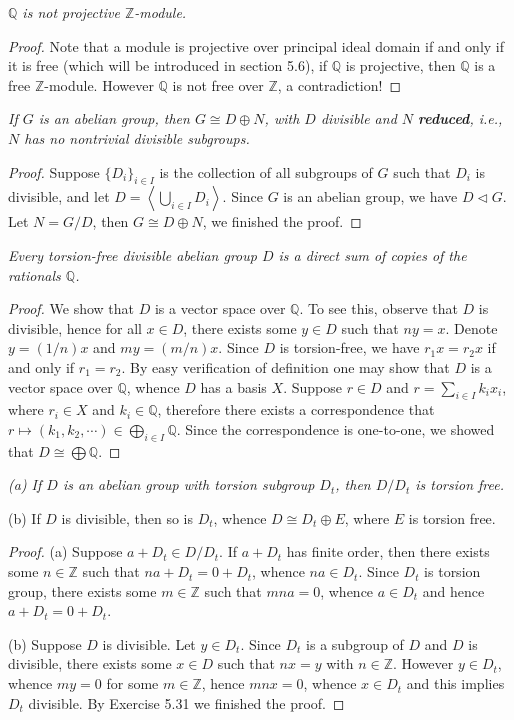 \begin{problem}\em
$\mathbb{Q}$ is not projective $\mathbb{Z}$-module.
\end{problem}
\begin{proof}
Note that a module is projective over principal ideal domain if and only if it is free (which will be introduced in section 5.6), if $\mathbb{Q}$ is projective, then $\mathbb{Q}$ is a free $\mathbb{Z}$-module. However $\mathbb{Q}$ is not free over $\mathbb{Z}$, a contradiction!
\end{proof}
\begin{problem}\em
If $G$ is an abelian group, then $G\cong D\oplus N$, with $D$ divisible and $N$ \textbf{reduced}, i.e., $N$ has no nontrivial divisible subgroups.
\end{problem}
\begin{proof}
Suppose $\{D_i\}_{i\in I}$ is the collection of all subgroups of $G$ such that $D_i$ is divisible, and let $D=\left<\bigcup_{i\in I}D_i\right>$. Since $G$ is an abelian group, we have $D\lhd G$. Let $N=G/D$, then $G\cong D\oplus N$, we finished the proof.
\end{proof}
\begin{problem}\em
Every torsion-free divisible abelian group $D$ is a direct sum of copies of the rationals $\mathbb{Q}$.
\end{problem}
\begin{proof}
We show that $D$ is a vector space over $\mathbb{Q}$. To see this, observe that $D$ is divisible, hence for all $x\in D$, there exists some $y\in D$ such that $ny=x$. Denote $y=(1/n)x$ and $my=(m/n)x$. Since $D$ is torsion-free, we have $r_1x=r_2x$ if and only if $r_1=r_2$. By easy verification of definition one may show that $D$ is a vector space over $\mathbb{Q}$, whence $D$ has a basis $X$. Suppose $r\in D$ and $r=\sum_{i\in I}k_ix_i$, where $r_i\in X$ and $k_i\in\mathbb{Q}$, therefore there exists a correspondence that $r\mapsto(k_1,k_2,\cdots)\in\bigoplus_{i\in I}\mathbb{Q}$. Since the correspondence is one-to-one, we showed that $D\cong\bigoplus\mathbb{Q}$.
\end{proof}
\begin{problem}\em
(a) If $D$ is an abelian group with torsion subgroup $D_t$, then $D/D_t$ is torsion free.\par
(b) If $D$ is divisible, then so is $D_t$, whence $D\cong D_t\oplus E$, where $E$ is torsion free.
\end{problem}
\begin{proof}
(a) Suppose $a+D_t\in D/D_t$. If $a+D_t$ has finite order, then there exists some $n\in\mathbb{Z}$ such that $na+D_t=0+D_t$, whence $na\in D_t$. Since $D_t$ is torsion group, there exists some $m\in\mathbb{Z}$ such that $mna=0$, whence $a\in D_t$ and hence $a+D_t=0+D_t$.\par
(b) Suppose $D$ is divisible. Let $y\in D_t$. Since $D_t$ is a subgroup of $D$ and $D$ is divisible, there exists some $x\in D$ such that $nx=y$ with $n\in\mathbb{Z}$. However $y\in D_t$, whence $my=0$ for some $m\in\mathbb{Z}$, hence $mnx=0$, whence $x\in D_t$ and this implies $D_t$ divisible. By Exercise 5.31 we finished the proof.
\end{proof}
